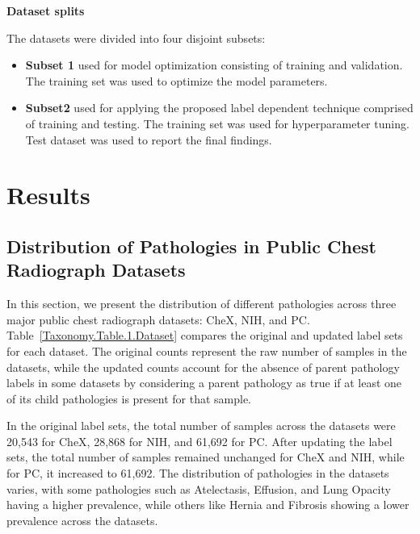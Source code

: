 \documentclass[preprint,3p,times, review]{elsarticle}
\begin{document}
\textbf{Dataset splits}

The datasets were divided into four disjoint subsets:

\begin{itemize}
    \item \textbf{Subset 1} used for model optimization consisting of training and validation. The training set was used to optimize the model parameters.
    \item \textbf{Subset2} used for applying the proposed label dependent technique comprised of training and testing. The training set was used for hyperparameter tuning. Test dataset was used to report the final findings.
\end{itemize}


\section{Results}

\subsection{Distribution of Pathologies in Public Chest Radiograph Datasets}

In this section, we present the distribution of different pathologies across three major public chest radiograph datasets: CheX, NIH, and PC\@. Table~\ref*{Taxonomy.Table.1.Dataset} compares the original and updated label sets for each dataset. The original counts represent the raw number of samples in the datasets, while the updated counts account for the absence of parent pathology labels in some datasets by considering a parent pathology as true if at least one of its child pathologies is present for that sample.

In the original label sets, the total number of samples across the datasets were 20,543 for CheX, 28,868 for NIH, and 61,692 for PC\@. After updating the label sets, the total number of samples remained unchanged for CheX and NIH, while for PC, it increased to 61,692. The distribution of pathologies in the datasets varies, with some pathologies such as Atelectasis, Effusion, and Lung Opacity having a higher prevalence, while others like Hernia and Fibrosis showing a lower prevalence across the datasets.
\end{document}
